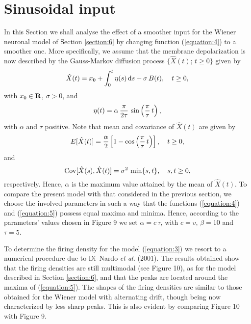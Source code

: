 \section{Sinusoidal input}\label{section:7}
In this Section we shall analyse the effect of a smoother input for the
Wiener neuronal model of Section \ref{section:6} by changing function
(\ref{equation:4}) to a smoother one. More specifically, we assume that
the membrane depolarization is now described by the Gauss-Markov diffusion
process $\{\hat X(t);\,t\geq 0\}$ given by
\begin{equation}
 \hat X(t)=x_0+\int_0^t\eta(s)\,{\rm d}s+\sigma\,B(t), \quad t\geq 0,
 \label{equation:3}
\end{equation}
with $x_0\in{\bf R}$, $\sigma>0$, and
$$
 \eta(t)=\alpha\,{\pi\over 2\tau}\,\sin\left({\pi\over \tau}\,t\right),
$$
with $\alpha$ and $\tau$ positive. Note that mean and covariance of
$\hat X(t)$ are given by
\begin{equation}
 E[\hat X(t)]={\alpha\over 2}
 \left[1-\cos\left({\pi\over \tau}\,t\right)\right],
 \quad t\geq 0,
 \label{equation:5}
\end{equation}
and
$$
 {\rm Cov}[\hat X(s),\hat X(t)]= \sigma^2\,\min\{s,t\},
 \quad s,t\geq 0,
$$
respectively. Hence, $\alpha$ is the maximum value attained by the mean of
$\hat X(t)$. To compare the present model with that considered in the previous
section, we choose the involved parameters in such a way that the functions
(\ref{equation:4}) and (\ref{equation:5}) possess equal maxima and minima.
Hence, according to the parameters' values chosen in Figure 9 we set 
$\alpha=c\,\tau$, with $c=v$, $\beta=10$ and $\tau=5$.
\par
To determine the firing density for the model (\ref{equation:3}) we resort 
to a numerical procedure due to Di~Nardo {\em et al.} (2001). 
The results obtained show that the firing densities
are still multimodal (see Figure 10), as for the model described in
Section \ref{section:6}, and that the peaks are located around the maxima
of (\ref{equation:5}). The shapes of the firing densities are similar to those
obtained for the Wiener model with alternating drift, though being now
characterized by less sharp peaks. This is also evident by comparing
Figure 10 with Figure 9. 
\begin{figure} 
\end{figure}
%
